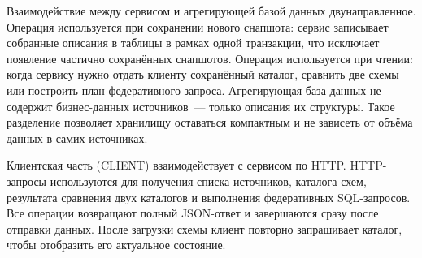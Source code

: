 \documentclass[../main.tex]{subfiles}
\begin{document}
Взаимодействие между сервисом и агрегирующей базой данных
двунаправленное. Операция  используется при
сохранении нового снапшота: сервис записывает собранные описания
в таблицы  в рамках одной транзакции, что исключает
появление частично сохранённых снапшотов. Операция 
используется при чтении: когда сервису нужно отдать клиенту
сохранённый каталог, сравнить две схемы или построить план
федеративного запроса. Агрегирующая база данных не содержит
бизнес-данных источников~--- только описания их структуры. Такое
разделение позволяет хранилищу оставаться компактным и не зависеть
от объёма данных в самих источниках.

Клиентская часть (CLIENT) взаимодействует с сервисом по HTTP.
HTTP-запросы используются для получения списка источников, каталога
схем, результата сравнения двух каталогов и выполнения федеративных
SQL-запросов. Все операции возвращают полный JSON-ответ
и завершаются сразу после отправки данных. После загрузки схемы
клиент повторно запрашивает каталог, чтобы отобразить его актуальное
состояние.
\end{document}
